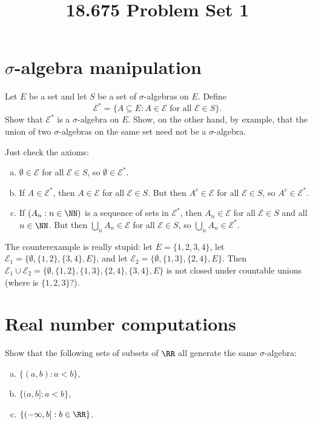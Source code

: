 \documentclass[11pt, headheight=30pt]{scrartcl}
\title{18.675 Problem Set 1}
\begin{document}
\section{$\sigma$-algebra manipulation}
\begin{prob*}
    Let $E$ be a set and let $S$ be a set of $\sigma$-algebras on $E$. Define
    \[
        \mathcal{E}^* = \{A \subseteq E : A \in \mathcal{E} \text{ for all } \mathcal{E} \in S\}.
    \]
    Show that $\mathcal{E}^*$ is a $\sigma$-algebra on $E$.
    Show, on the other hand, by example, that the union
    of two $\sigma$-algebras on the same set need not be a $\sigma$-algebra.
\end{prob*}

Just check the axioms:
\begin{enumerate}[(a)]
    \item $\emptyset \in \mathcal{E}$ for all $\mathcal{E} \in S$,
    so $\emptyset \in \mathcal{E}^*$.
    \item If $A \in \mathcal{E}^*$, then $A \in \mathcal{E}$
    for all $\mathcal{E} \in S$.
        But then $A^c \in \mathcal{E}$ for all $\mathcal{E} \in S$,
        so $A^c \in \mathcal{E}^*$.
    \item If $(A_n : n \in \NN)$ is a sequence of sets in $\mathcal{E}^*$, then
        $A_n \in \mathcal{E}$ for all $\mathcal{E} \in S$ and all $n \in \NN$.
        But then $\bigcup_n A_n \in \mathcal{E}$ for all $\mathcal{E} \in S$,
        so $\bigcup_n A_n \in \mathcal{E}^*$.
\end{enumerate}

The counterexample is really stupid: let $E = \{1,2,3,4\}$, let
$\mathcal{E}_1 = \{\emptyset, \{1,2\}, \{3,4\}, E\}$, and let
$\mathcal{E}_2 = \{\emptyset, \{1,3\}, \{2,4\}, E\}$. Then
$\mathcal{E}_1 \cup \mathcal{E}_2 = \{\emptyset, \{1,2\}, \{1,3\}, \{2,4\}, \{3,4\}, E\}$
is not closed under countable unions (where is $\{1,2,3\}$?).
\pagebreak
\section{Real number computations}
\begin{prob*}
    Show that the following sets of subsets of $\RR$ all generate
    the same $\sigma$-algebra:
    \begin{enumerate}[(a)]
        \item $\{(a, b) : a < b\}$,
        \item $\{(a, b] : a < b\}$,
        \item $\{(-\infty, b] : b \in \RR\}$.
    \end{enumerate}
\end{prob*}
\end{document}
